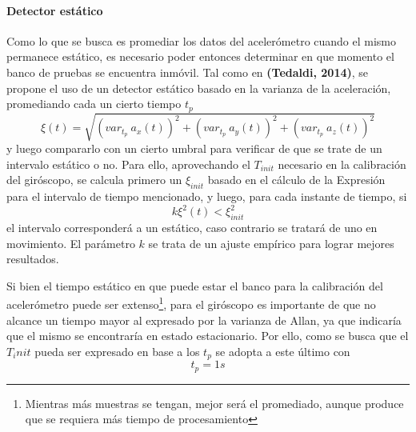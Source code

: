 \paragraph{Detector estático}
Como lo que se busca es promediar los datos del acelerómetro cuando el mismo permanece estático, es necesario poder entonces determinar en que momento el banco de pruebas se encuentra inmóvil. Tal como en \textbf{(Tedaldi, 2014)}, se propone el uso de un detector estático basado en la varianza de la aceleración, promediando cada un cierto tiempo $t_p$
\begin{equation}
    \xi(t) = \sqrt{(var_{t_p}\ a_x(t))^2 + (var_{t_p}\ a_y(t))^2 + (var_{t_p}\ a_z(t))^2}
\end{equation}
y luego compararlo con un cierto umbral para verificar de que se trate de un intervalo estático o no. Para ello, aprovechando el $T_{init}$ necesario en la calibración del giróscopo, se calcula primero un $\xi_{init}$ basado en el cálculo de la Expresión para el intervalo de tiempo mencionado, y luego, para cada instante de tiempo, si
\begin{equation}
     k\xi^2(t) < \xi^2_{init}
\end{equation}
el intervalo corresponderá a un estático, caso contrario se tratará de uno en movimiento. El parámetro $k$ se trata de un ajuste empírico para lograr mejores resultados.

Si bien el tiempo estático en que puede estar el banco para la calibración del acelerómetro puede ser extenso\footnote{Mientras más muestras se tengan, mejor será el promediado, aunque produce que se requiera más tiempo de procesamiento}, para el giróscopo es importante de que no alcance un tiempo mayor al expresado por la varianza de Allan, ya que indicaría que el mismo se encontraría en estado estacionario. Por ello, como se busca que el $T_init$ pueda ser expresado en base a los $t_p$ se adopta a este último con
\begin{equation}
    t_p = 1 s
\end{equation}

